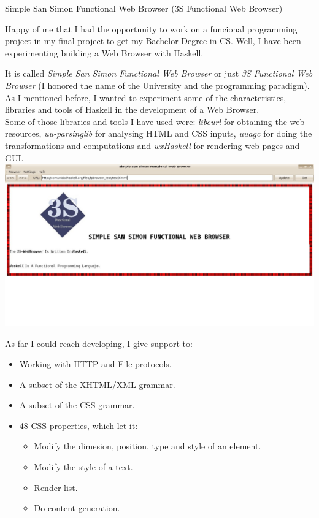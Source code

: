 \documentclass{scrreprt}
\begin{document}
\begin{hcarentry}{Simple San Simon Functional Web Browser (3S Functional Web Browser)}
\makeheader

Happy of me that I had the opportunity to work on a funcional programming project in my final project to get 
my Bachelor Degree in CS. Well, I have been experimenting building a Web Browser with Haskell.

It is called \textit{Simple San Simon Functional Web Browser} or just \textit{3S Functional Web Browser} 
(I honored the name of the University and the programming paradigm). As I mentioned before, I wanted to experiment some 
of the characteristics, libraries and tools of Haskell in the development of a Web Browser.\\

Some of those libraries and tools I have used were: \textit{libcurl} for obtaining the web resources, \textit{uu-parsinglib} 
for analysing HTML and CSS inputs, \textit{uuagc} for doing the transformations and computations and \textit{wxHaskell} for rendering web pages
and GUI.\\

\includegraphics[scale=0.35]{img3sfwb.jpg}

As far I could reach developing, I give support to:
\begin{itemize}
    \item Working with HTTP and File protocols.
    \item A subset of the XHTML/XML grammar.
    \item A subset of the CSS grammar.
    \item 48 CSS properties, which let it:
        \begin{itemize}
            \item Modify the dimesion, position, type and style of an element.
            \item Modify the style of a text.
            \item Render list.
            \item Do content generation.
        \end{itemize}
\end{itemize}


\end{hcarentry}
\end{document}
